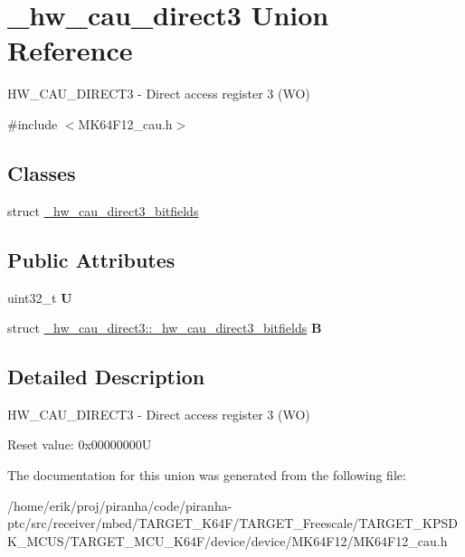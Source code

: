 \hypertarget{union__hw__cau__direct3}{}\section{\+\_\+hw\+\_\+cau\+\_\+direct3 Union Reference}
\label{union__hw__cau__direct3}


H\+W\+\_\+\+C\+A\+U\+\_\+\+D\+I\+R\+E\+C\+T3 -\/ Direct access register 3 (WO)  




{\ttfamily \#include $<$M\+K64\+F12\+\_\+cau.\+h$>$}

\subsection*{Classes}
\begin{DoxyCompactItemize}
\item 
struct \hyperlink{struct__hw__cau__direct3_1_1__hw__cau__direct3__bitfields}{\+\_\+hw\+\_\+cau\+\_\+direct3\+\_\+bitfields}
\end{DoxyCompactItemize}
\subsection*{Public Attributes}
\begin{DoxyCompactItemize}
\item 
uint32\+\_\+t {\bfseries U}\hypertarget{union__hw__cau__direct3_a6da753e61353502357098a964bb8a151}{}\label{union__hw__cau__direct3_a6da753e61353502357098a964bb8a151}

\item 
struct \hyperlink{struct__hw__cau__direct3_1_1__hw__cau__direct3__bitfields}{\+\_\+hw\+\_\+cau\+\_\+direct3\+::\+\_\+hw\+\_\+cau\+\_\+direct3\+\_\+bitfields} {\bfseries B}\hypertarget{union__hw__cau__direct3_a5d06a4a7bb876719393e33b9bda005e2}{}\label{union__hw__cau__direct3_a5d06a4a7bb876719393e33b9bda005e2}

\end{DoxyCompactItemize}


\subsection{Detailed Description}
H\+W\+\_\+\+C\+A\+U\+\_\+\+D\+I\+R\+E\+C\+T3 -\/ Direct access register 3 (WO) 

Reset value\+: 0x00000000U 

The documentation for this union was generated from the following file\+:\begin{DoxyCompactItemize}
\item 
/home/erik/proj/piranha/code/piranha-\/ptc/src/receiver/mbed/\+T\+A\+R\+G\+E\+T\+\_\+\+K64\+F/\+T\+A\+R\+G\+E\+T\+\_\+\+Freescale/\+T\+A\+R\+G\+E\+T\+\_\+\+K\+P\+S\+D\+K\+\_\+\+M\+C\+U\+S/\+T\+A\+R\+G\+E\+T\+\_\+\+M\+C\+U\+\_\+\+K64\+F/device/device/\+M\+K64\+F12/M\+K64\+F12\+\_\+cau.\+h\end{DoxyCompactItemize}
